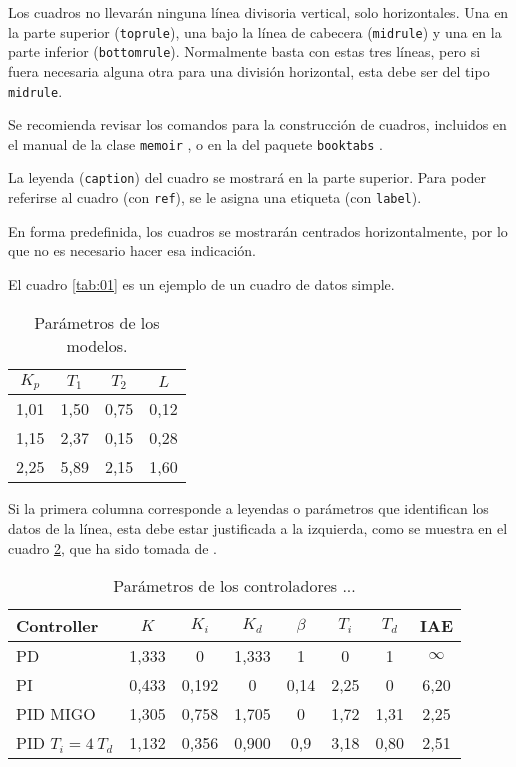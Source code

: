 Los cuadros no llevarán ninguna línea divisoria vertical, solo horizontales. Una en la parte superior (\texttt{toprule}), una bajo la línea de cabecera (\texttt{midrule}) y una en la parte inferior (\texttt{bottomrule}).  Normalmente basta con estas tres líneas, pero si fuera necesaria alguna otra para una división horizontal, esta debe ser del tipo \texttt{midrule}.

Se recomienda revisar los comandos para la construcción de cuadros, incluidos en el manual de la clase \texttt{memoir} \citep{memoir2011}, o en la del paquete \texttt{booktabs} \citep{fear2005}.

La leyenda (\texttt{caption}) del cuadro se mostrará en la parte superior.  Para poder referirse al cuadro (con \texttt{ref}), se le asigna una etiqueta (con \texttt{label}).

En forma predefinida, los cuadros se mostrarán centrados horizontalmente, por lo que no es necesario hacer esa indicación. 

El cuadro \ref{tab:01} es un ejemplo de un cuadro de datos simple.

\begin{table}
\caption{Parámetros de los modelos.} \label{tab:01o}
		\begin{tabular}{@{}*{4}{c}@{}}
    \toprule
    $K_p$ & $T_1$ & $T_2$ & $L$ \\
    \midrule
     1,01 & 1,50 & 0,75 & 0,12 \\
		 1,15 & 2,37 & 0,15 & 0,28 \\
		 2,25 & 5,89 & 2,15 & 1,60 \\
    \bottomrule
    \end{tabular}
\end{table}

Si la primera columna corresponde a leyendas o parámetros que identifican los datos de la línea, esta debe estar justificada a la izquierda, como se muestra en el cuadro \ref{tab:AH}, que ha sido tomada de \cite{astromhagglund2006}.

\begin{table}
\caption{Parámetros de los controladores ...} \label{tab:AH}
\begin{center}
    \begin{tabular}{@{}l*{7}{c}@{}}
    \toprule
    Controller & $K$ & $K_i$ & $K_d$ & $\beta$ & $T_i$ & $T_d$ & IAE \\
    \midrule
    PD &  1,333 & 0 & 1,333 & 1 & 0 &1 & $\infty$ \\
		PI & 0,433 & 0,192 & 0 & 0,14 & 2,25 & 0 & 6,20 \\
		PID MIGO & 1,305 & 0,758 & 1,705 & 0 & 1,72 & 1,31 & 2,25 \\
		PID $T_i=4 \ T_d$ & 1,132 & 0,356 & 0,900 & 0,9 & 3,18 & 0,80 & 2,51 \\
    \bottomrule
    \end{tabular}
\end{center}
\end{table}

